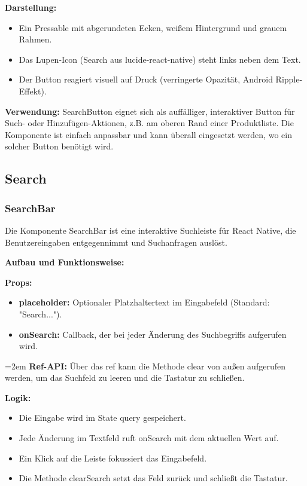 \documentclass[12pt, a4paper]{report} %
\begin{document}
\textbf{Darstellung:}
\begin{itemize}
    \item Ein Pressable mit abgerundeten Ecken, weißem Hintergrund und grauem Rahmen.
    \item Das Lupen-Icon (Search aus lucide-react-native) steht links neben dem Text.
    \item Der Button reagiert visuell auf Druck (verringerte Opazität, Android Ripple-Effekt).
\end{itemize}

\noindent\textbf{Verwendung:} SearchButton eignet sich als auffälliger, interaktiver Button für Such- oder Hinzufügen-Aktionen, z.B. am oberen Rand einer Produktliste. Die Komponente ist einfach anpassbar und kann überall eingesetzt werden, wo ein solcher Button benötigt wird.

\subsection{Search}

\subsubsection{SearchBar}
Die Komponente SearchBar ist eine interaktive Suchleiste für React Native, die Benutzereingaben entgegennimmt und Suchanfragen auslöst.

\noindent\textbf{Aufbau und Funktionsweise:}

\textbf{Props:}
\begin{itemize}
    \item \textbf{placeholder:} Optionaler Platzhaltertext im Eingabefeld (Standard: "Search...").
    \item \textbf{onSearch:} Callback, der bei jeder Änderung des Suchbegriffs aufgerufen wird.
\end{itemize}

\hangindent=2em
\textbf{Ref-API:}
Über das ref kann die Methode clear von außen aufgerufen werden, um das Suchfeld zu leeren und die Tastatur zu schließen.

\textbf{Logik:}
\begin{itemize}
    \item Die Eingabe wird im State query gespeichert.
    \item Jede Änderung im Textfeld ruft onSearch mit dem aktuellen Wert auf.
    \item Ein Klick auf die Leiste fokussiert das Eingabefeld.
    \item Die Methode clearSearch setzt das Feld zurück und schließt die Tastatur.
\end{itemize}
\end{document}
